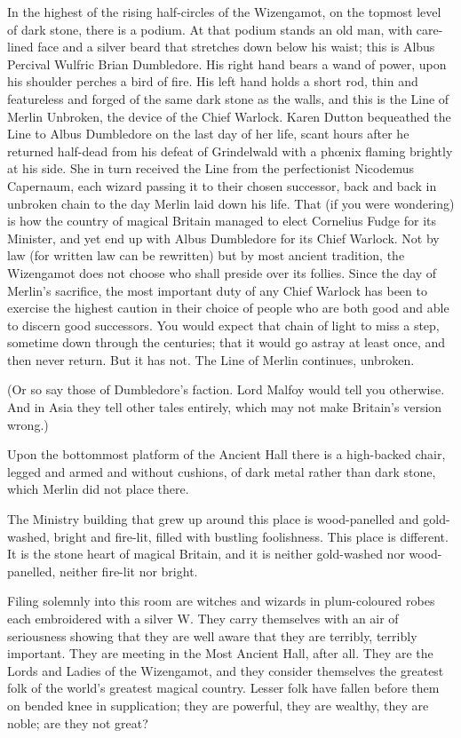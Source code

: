 In the highest of the rising half-circles of the Wizengamot, on the topmost level of dark stone, there is a podium. At that podium stands an old man, with care-lined face and a silver beard that stretches down below his waist; this is Albus Percival Wulfric Brian Dumbledore. His right hand bears a wand of power, upon his shoulder perches a bird of fire. His left hand holds a short rod, thin and featureless and forged of the same dark stone as the walls, and this is the Line of Merlin Unbroken, the device of the Chief Warlock. Karen Dutton bequeathed the Line to Albus Dumbledore on the last day of her life, scant hours after he returned half-dead from his defeat of Grindelwald with a phœnix flaming brightly at his side. She in turn received the Line from the perfectionist Nicodemus Capernaum, each wizard passing it to their chosen successor, back and back in unbroken chain to the day Merlin laid down his life. That (if you were wondering) is how the country of magical Britain managed to elect Cornelius Fudge for its Minister, and yet end up with Albus Dumbledore for its Chief Warlock. Not by law (for written law can be rewritten) but by most ancient tradition, the Wizengamot does not choose who shall preside over its follies. Since the day of Merlin's sacrifice, the most important duty of any Chief Warlock has been to exercise the highest caution in their choice of people who are both good and able to discern good successors. You would expect that chain of light to miss a step, sometime down through the centuries; that it would go astray at least once, and then never return. But it has not. The Line of Merlin continues, unbroken.

(Or so say those of Dumbledore's faction. Lord Malfoy would tell you otherwise. And in Asia they tell other tales entirely, which may not make Britain's version wrong.)

Upon the bottommost platform of the Ancient Hall there is a high-backed chair, legged and armed and without cushions, of dark metal rather than dark stone, which Merlin did not place there.

The Ministry building that grew up around this place is wood-panelled and gold-washed, bright and fire-lit, filled with bustling foolishness. This place is different. It is the stone heart of magical Britain, and it is neither gold-washed nor wood-panelled, neither fire-lit nor bright.

Filing solemnly into this room are witches and wizards in plum-coloured robes each embroidered with a silver W\@. They carry themselves with an air of seriousness showing that they are well aware that they are terribly, terribly important. They are meeting in the Most Ancient Hall, after all. They are the Lords and Ladies of the Wizengamot, and they consider themselves the greatest folk of the world's greatest magical country. Lesser folk have fallen before them on bended knee in supplication; they are powerful, they are wealthy, they are noble; are they not great?

